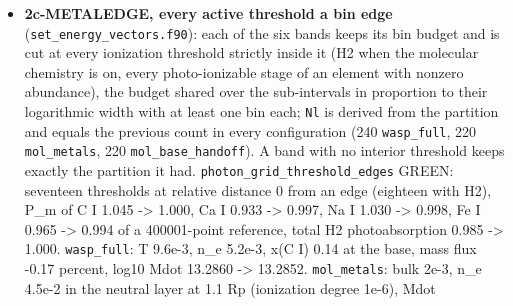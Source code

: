 \documentclass[english,a4paper]{my_memo}
\begin{document}
\begin{itemize}
  \texttt{Cool\_coeff.f90}, \texttt{binary\_element\_diffusion.f90},
  \texttt{diffusive\_photochemistry.f90}, \texttt{lyman\_werner.f90}, \texttt{oxygen\_rates.f90}):
  \texttt{m\_He\_atom\ =\ 6.6464790722e-24} g (4.002603254 u x CODATA 2018 u; the brief\textquotesingle s
  6.6464731e-24 was 9.2e-7 low and is not the helium-4 atom), \texttt{amu}, \texttt{m\_e},
  \texttt{m\_p} in \texttt{parameters.f90}, \texttt{m\_He\_over\_m\_H} and \texttt{amu\_over\_m\_H} derived,
  \texttt{bsp\_mass} built from them, \texttt{melem\_A\ =\ melem\_A\_u\ *\ amu/mu}. This closed a
  UNIT ERROR: the standard atomic weights in u had been added to mass sums
  carried in hydrogen atoms, every metal nucleus 0.78 percent too heavy in
  \texttt{rho}, the mean molecular weight, the base composition, the census closure
  and the metal element diffusion. The advisor closed the remaining local
  copies (\texttt{Cool\_coeff} line-center opacity now takes the atomic weight in u
  and uses the global \texttt{amu}; \texttt{amu\_C/N/O\ =\ melem\_A\_u(iel\_*)}; the local
  \texttt{m\_amu\_g} and \texttt{kb\_erg}/\texttt{m\_h2} copies of the diffusion, Lyman-Werner and
  oxygen modules replaced by the globals). \texttt{wasp\_full} 1.0e-3 at most
  (base v), mass flux +3.2e-5; \texttt{mol\_base\_handoff} 2.8e-5; printed Mdot
  unchanged.
\item
  \textbf{2c-METALEDGE, every active threshold a bin edge}
  (\texttt{set\_energy\_vectors.f90}): each of the six bands keeps its bin budget and
  is cut at every ionization threshold strictly inside it (H2 when the
  molecular chemistry is on, every photo-ionizable stage of an element with
  nonzero abundance), the budget shared over the sub-intervals in proportion
  to their logarithmic width with at least one bin each; \texttt{Nl} is derived
  from the partition and equals the previous count in every configuration
  (240 \texttt{wasp\_full}, 220 \texttt{mol\_metals}, 220 \texttt{mol\_base\_handoff}). A band with
  no interior threshold keeps exactly the partition it had.
  \texttt{photon\_grid\_threshold\_edges} GREEN: seventeen thresholds at relative
  distance 0 from an edge (eighteen with H2), P\_m of C I 1.045 -\textgreater{} 1.000,
  Ca I 0.933 -\textgreater{} 0.997, Na I 1.030 -\textgreater{} 0.998, Fe I 0.965 -\textgreater{} 0.994 of a
  400001-point reference, total H2 photoabsorption 0.985 -\textgreater{} 1.000.
  \texttt{wasp\_full}: T 9.6e-3, n\_e 5.2e-3, x(C I) 0.14 at the base, mass flux
  -0.17 percent, log10 Mdot 13.2860 -\textgreater{} 13.2852. \texttt{mol\_metals}: bulk 2e-3,
  n\_e 4.5e-2 in the neutral layer at 1.1 Rp (ionization degree 1e-6), Mdot

\end{itemize}
\end{document}
